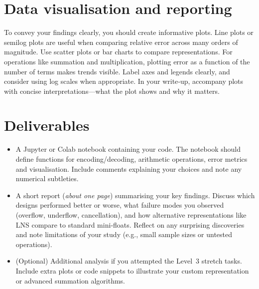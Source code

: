 \documentclass[11pt]{article}
\begin{document}


\section{Data visualisation and reporting}

To convey your findings clearly, you should create informative plots.  Line plots or
semilog plots are useful when comparing relative error across many orders of magnitude.
Use scatter plots or bar charts to compare representations.  For operations like
summation and multiplication, plotting error as a function of the number of terms makes
trends visible.  Label axes and legends clearly, and consider using log scales when
appropriate.  In your write‑up, accompany plots with concise interpretations—what the
plot shows and why it matters.

\section{Deliverables}

\begin{itemize}
  \item A Jupyter or Colab notebook containing your code.  The notebook should define
    functions for encoding/decoding, arithmetic operations, error metrics and
    visualisation.  Include comments explaining your choices and note any numerical
    subtleties.
  \item A short report (\emph{about one page}) summarising your key findings.  Discuss
    which designs performed better or worse, what failure modes you observed (overflow,
    underflow, cancellation), and how alternative representations like LNS compare to
    standard mini‑floats.  Reflect on any surprising discoveries and note limitations of
    your study (e.g., small sample sizes or untested operations).
  \item (Optional) Additional analysis if you attempted the Level~3 stretch tasks.
    Include extra plots or code snippets to illustrate your custom representation or
    advanced summation algorithms.
\end{itemize}
\end{document}
